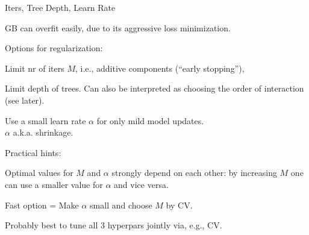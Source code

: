 \documentclass[11pt,compress,t,notes=noshow, xcolor=table]{beamer}
\begin{document}

\begin{vbframe}{Iters, Tree Depth, Learn Rate}

GB can overfit easily, due to its aggressive loss minimization.

\begin{blocki}{Options for regularization:}
\item Limit nr of iters $M$, i.e., additive components (\enquote{early stopping}),
\item Limit depth of trees.
    Can also be interpreted as choosing the order of interaction (see later).
\item Use a small learn rate $\alpha$ for only mild model updates. \\
    $\alpha$ a.k.a. shrinkage.
\end{blocki}







\begin{blocki}{Practical hints:}
\item Optimal values for $M$ and $\alpha$ strongly depend on each other:
by increasing $M$ one can use a smaller value for $\alpha$ and vice versa.

\item Fast option = Make $\alpha$ small and choose $M$ by CV. 

\item Probably best to tune all 3 hyperpars jointly via, e.g., CV.
\end{blocki}

\end{vbframe}
\end{document}
